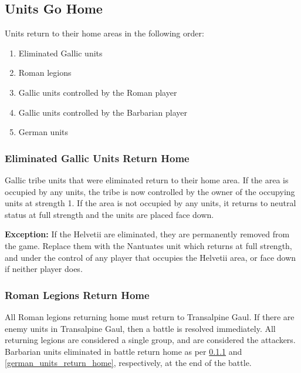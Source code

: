 \begin{samepage}
\subsection{Units Go Home}
\par
Units return to their home areas in the following order:
\begin{enumerate}
  \setlength\itemsep{0em}
  \item {\small Eliminated Gallic units}
  \item {\small Roman legions}
  \item {\small Gallic units controlled by the Roman player}
  \item {\small Gallic units controlled by the Barbarian player}
  \item {\small German units}
\end{enumerate}
\end{samepage}

\subsubsection{Eliminated Gallic Units Return Home}
\label{eliminated_gallic_units_return_home}
\par
Gallic tribe units that were eliminated return to their home area. If the area is occupied by any units, the tribe is now controlled by the owner of the occupying units at strength 1. If the area is not occupied by any units, it returns to neutral status at full strength and the units are placed face down.

\textbf{Exception:} If the Helvetii are eliminated, they are permanently removed from the game. Replace them with the Nantuates unit which returns at full strength, and under the control of any player that occupies the Helvetii area, or face down if neither player does.

\subsubsection{Roman Legions Return Home}
\par
All Roman legions returning home must return to Transalpine Gaul. If there are enemy units in Transalpine Gaul, then a battle is resolved immediately. All returning legions are considered a single group, and are considered the attackers. Barbarian units eliminated in battle return home as per \ref{eliminated_gallic_units_return_home} and \ref{german_units_return_home}, respectively, at the end of the battle.

